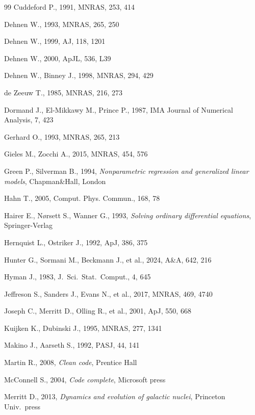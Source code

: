 \documentclass[12pt]{article}
\begin{document}
\begin{thebibliography}{99}
Cuddeford P., 1991, MNRAS, 253, 414

Dehnen W., 1993, MNRAS, 265, 250

Dehnen W., 1999, AJ, 118, 1201

Dehnen W., 2000, ApJL, 536, L39

Dehnen W., Binney J., 1998, MNRAS, 294, 429

de Zeeuw T., 1985, MNRAS, 216, 273

Dormand J., El-Mikkawy M., Prince P., 1987, IMA Journal of Numerical Analysis, 7, 423

Gerhard O., 1993, MNRAS, 265, 213

Gieles M., Zocchi A., 2015, MNRAS, 454, 576

Green P., Silverman B., 1994, \textsl{Nonparametric regression and generalized linear models}, Chapman\&Hall, London

Hahn T., 2005, Comput. Phys. Commun., 168, 78

Hairer E., N{\o}rsett S., Wanner G., 1993, \textsl{Solving ordinary differential equations}, Springer-Verlag

Hernquist L., Ostriker J., 1992, ApJ, 386, 375

Hunter G., Sormani M., Beckmann J., et al., 2024, A\&A, 642, 216

Hyman J., 1983, J.~Sci.~Stat.~Comput., 4, 645

Jeffreson S., Sanders J., Evans N., et al., 2017, MNRAS, 469, 4740

Joseph C., Merritt D., Olling R., et al., 2001, ApJ, 550, 668

Kuijken K., Dubinski J., 1995, MNRAS, 277, 1341

Makino J., Aarseth S., 1992, PASJ, 44, 141

Martin R., 2008, \textsl{Clean code}, Prentice Hall

McConnell S., 2004, \textsl{Code complete}, Microsoft press

Merritt D., 2013, \textsl{Dynamics and evolution of galactic nuclei}, Princeton Univ.\ press


\end{thebibliography}
\end{document}
